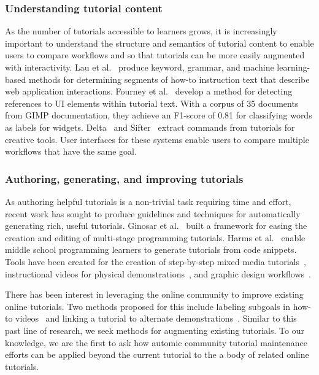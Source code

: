 \subsubsection{Understanding tutorial content}

As the number of tutorials accessible to learners grows, it is increasingly important to understand the structure and semantics of tutorial content to enable users to compare workflows and so that tutorials can be more easily augmented with interactivity.
Lau et al.~\cite{lau_interpreting_2009} produce keyword, grammar, and machine learning-based methods for determining segments of how-to instruction text that describe web application interactions.
Fourney et al.~\cite{fourney_then_2012} develop a method for detecting references to UI elements within tutorial text.
With a corpus of 35 documents from GIMP documentation, they achieve an F1-score of 0.81 for classifying words as labels for widgets.
Delta~\cite{kong_delta_2012} and Sifter~\cite{pavel_browsing_2013} extract commands from tutorials for creative tools.
User interfaces for these systems enable users to compare multiple workflows that have the same goal.

\subsubsection{Authoring, generating, and improving tutorials}

As authoring helpful tutorials is a non-trivial task requiring time and effort, recent work has sought to produce guidelines and techniques for automatically generating rich, useful tutorials.
Ginosar et al.~\cite{ginosar_authoring_2013} built a framework for easing the creation and editing of multi-stage programming tutorials.
Harms et al.~\cite{harms_automatically_2013} enable middle school programming learners to generate tutorials from code snippets.
Tools have been created for the creation of step-by-step mixed media tutorials~\cite{chi_mixt_2012}, instructional videos for physical demonstrations~\cite{chi_democut_2013}, and graphic design workflows~\cite{grossman_chronicle_2010}.

There has been interest in leveraging the online community to improve existing online tutorials.
Two methods proposed for this include labeling subgoals in how-to videos~\cite{kim_learnersourcing_2013} and linking a tutorial to alternate demonstrations~\cite{lafreniere_community_2013}.
Similar to this past line of research, we seek methods for augmenting existing tutorials.
To our knowledge, we are the first to ask how automic community tutorial maintenance efforts can be applied beyond the current tutorial to the a body of related online tutorials.
